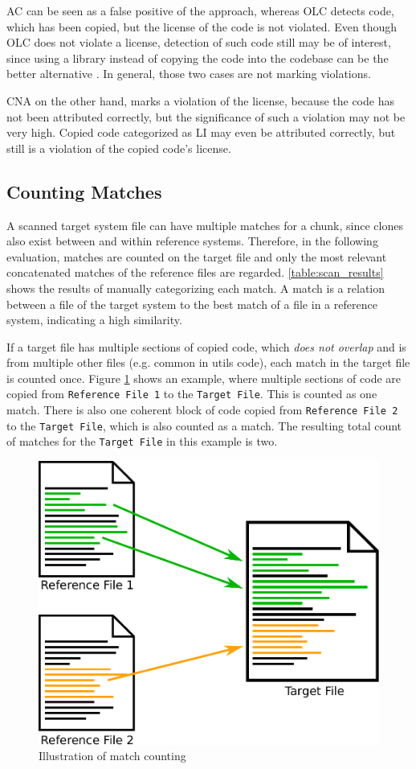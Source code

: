 AC can be seen as a false positive of the approach, whereas OLC detects code, which has been copied, but the license of the code is not violated.
Even though OLC does not violate a license, detection of such code still may be of interest, since using a library instead of copying the code into the codebase can be the better alternative \cite{heinemann2012effective}.
In general, those two cases are not marking violations.

CNA on the other hand, marks a violation of the license, because the code has not been attributed correctly, but the significance of such a violation may not be very high.
Copied code categorized as LI may even be attributed correctly, but still is a violation of the copied code's license.

\subsection{Counting Matches}
A scanned target system file can have multiple matches for a chunk, since clones also exist between and within reference systems.
Therefore, in the following evaluation, matches are counted on the target file and only the most relevant concatenated matches of the reference files are regarded.
\autoref{table:scan_results} shows the results of manually categorizing each match.
A match is a relation between a file of the target system to the best match of a file in a reference system, indicating a high similarity.

If a target file has multiple sections of copied code, which \textit{does not overlap} and is from multiple other files (e.g. common in utils code), each match in the target file is counted once.
Figure \ref{fig:match_counting} shows an example, where multiple sections of code are copied from \texttt{Reference File 1} to the \texttt{Target File}.
This is counted as one match.
There is also one coherent block of code copied from \texttt{Reference File 2} to the \texttt{Target File}, which is also counted as a match.
The resulting total count of matches for the \texttt{Target File} in this example is two.

\begin{figure}[h]
	\centering
	\includegraphics[width=0.7\linewidth]{figures/match_counting.pdf}
	\caption{Illustration of match counting}\label{fig:match_counting}
\end{figure}

